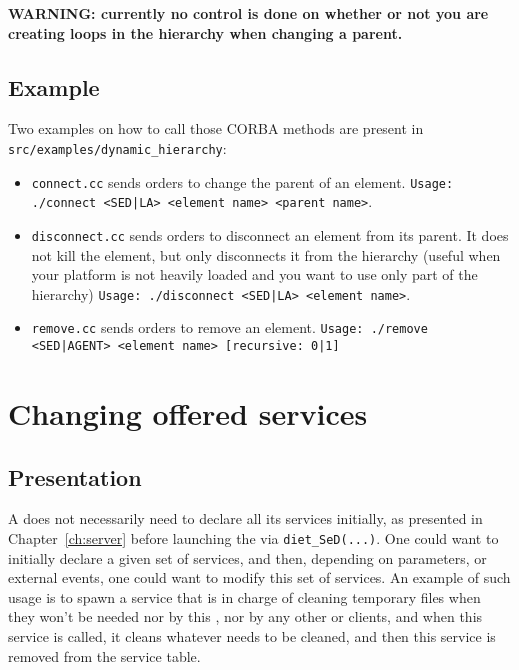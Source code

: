 \textbf{WARNING: currently no control is done on whether or not you
  are creating loops in the hierarchy when changing a parent.}

\subsection{Example}

Two examples on how to call those CORBA methods are present in\newline
\texttt{src/examples/dynamic\_hierarchy}:
\begin{itemize}
\item \texttt{connect.cc} sends orders to change the parent of an element.\newline
%
    \texttt{Usage: ./connect <SED|LA> <element name> <parent name>}.

\item \texttt{disconnect.cc} sends orders to disconnect an element
  from its parent. It does not kill the element, but only disconnects
  it from the \diet hierarchy (useful when your platform is not
  heavily loaded and you want to use only part of the
  hierarchy)\newline
%
  \texttt{Usage: ./disconnect <SED|LA> <element name>}.

\item \texttt{remove.cc} sends orders to remove an element.\newline
%
    \texttt{Usage: ./remove <SED|AGENT> <element name> [recursive: 0|1]}
\end{itemize}


\section{Changing offered services}

\subsection{Presentation}
A \sed does not necessarily need to declare all its services
initially, \ie as presented in Chapter~\ref{ch:server} before
launching the \sed via \verb|diet_SeD(...)|. One could want to
initially declare a given set of services, and then, depending on
parameters, or external events, one could want to modify this set of
services. An example of such usage is to spawn a service that is in
charge of cleaning temporary files when they won't be needed nor by
this \sed, nor by any other \sed or clients, and when this service is
called, it cleans whatever needs to be cleaned, and then this service
is removed from the service table.

